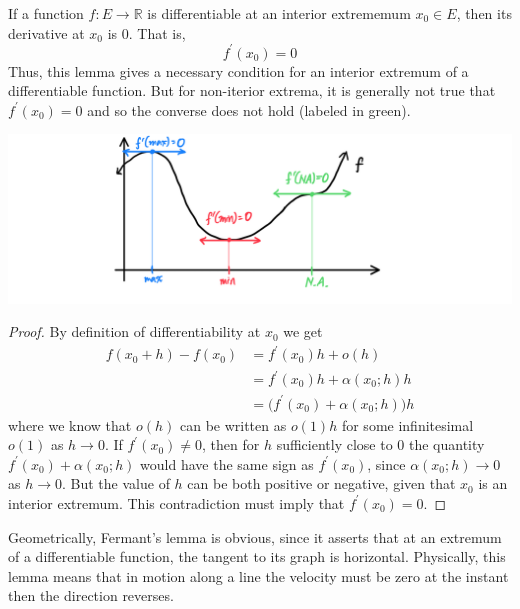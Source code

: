 \documentclass{article}
\begin{document}
    \begin{lemma}[Fermant]
      If a function $f: E \longrightarrow \mathbb{R}$ is differentiable at an interior extrememum $x_0 \in E$, then its derivative at $x_0$ is $0$. That is, 
      \[f^\prime (x_0) = 0\]
      Thus, this lemma gives a necessary condition for an interior extremum of a differentiable function. But for non-iterior extrema, it is generally not true that $f^\prime(x_0) = 0$ and so the converse does not hold (labeled in green). 
      \begin{center}
          \includegraphics[scale=0.25]{img/Fermant_Condition_for_Extrema.PNG}
      \end{center}
    \end{lemma}
    \begin{proof}
    By definition of differentiability at $x_0$ we get
    \begin{align*}
        f(x_0 + h) - f(x_0) & = f^\prime (x_0) h + o(h) \\
        & = f^\prime(x_0) h + \alpha (x_0; h) h \\
        & = \big(f^\prime (x_0) + \alpha(x_0; h)\big) h
    \end{align*}
    where we know that $o(h)$ can be written as $o(1) h$ for some infinitesimal $o(1)$ as $h \rightarrow 0$. If $f^\prime (x_0) \neq 0$, then for $h$ sufficiently close to $0$ the quantity $f^\prime(x_0) + \alpha(x_0; h)$ would have the same sign as $f^\prime (x_0)$, since $\alpha(x_0; h) \rightarrow 0$ as $h \rightarrow 0$. But the value of $h$ can be both positive or negative, given that $x_0$ is an interior extremum. This contradiction must imply that $f^\prime (x_0) = 0$. 
    \end{proof}

    Geometrically, Fermant's lemma is obvious, since it asserts that at an extremum of a differentiable function, the tangent to its graph is horizontal. Physically, this lemma means that in motion along a line the velocity must be zero at the instant then the direction reverses. 
\end{document}
